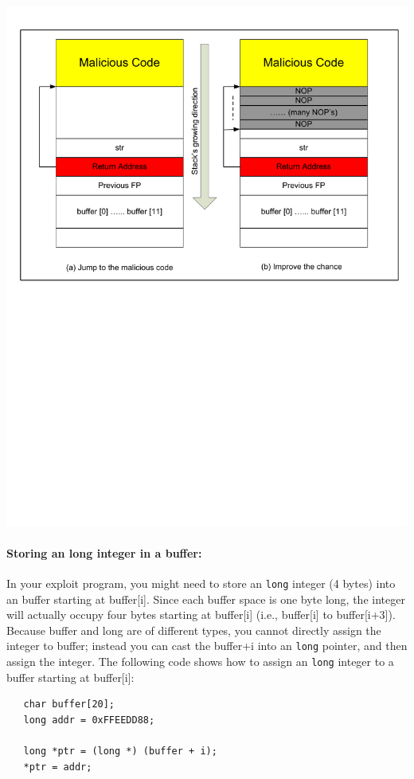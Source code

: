 \begin{center}
\includegraphics*[viewport=0.25in 5.2in 8.30in 10.55in]{Figs/buffer_overflow_jump_to_malicious_code.pdf}
\end{center}


\paragraph{Storing an long integer in a buffer:} 
In your exploit program, you might need to store an {\tt long} 
integer (4 bytes) into an buffer starting at buffer[i]. 
Since each buffer space is one byte long,
the integer will actually occupy four bytes starting at buffer[i] (i.e.,
buffer[i] to buffer[i+3]). Because buffer and long are of different
types, you cannot directly assign the integer to buffer; instead you can 
cast the buffer+i into an {\tt long} pointer, and then assign the integer. The
following code shows how to assign an {\tt long} integer to a buffer
starting at buffer[i]:
\begin{verbatim}
   char buffer[20];
   long addr = 0xFFEEDD88;

   long *ptr = (long *) (buffer + i);
   *ptr = addr;
\end{verbatim}

